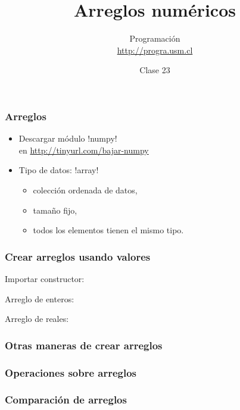 \documentclass[12pt]{beamer}
\title{Arreglos numéricos}
\author{
  Programación \\ \url{http://progra.usm.cl}
}
\date{Clase 23}
\begin{document}
  \begin{frame}
    \maketitle
  \end{frame}

  \begin{frame}
    \label{intro-arreglos}
    \frametitle{Arreglos}
    \begin{itemize}
      \item Descargar módulo \li!numpy! \\
        en \url{http://tinyurl.com/bajar-numpy}
        \vfill
      \item Tipo de datos: \li!array!
        \begin{itemize}
          \item colección ordenada de datos,
          \item tamaño fijo,
          \item todos los elementos
            tienen el mismo tipo.
        \end{itemize}
    \end{itemize}
  \end{frame}

  \begin{frame}
    \label{crear-arreglo-valores}
    \frametitle{Crear arreglos usando valores}
    Importar constructor:
    
    \vfill
    Arreglo de enteros:
    
    \vfill
    Arreglo de reales:
    
  \end{frame}

  \begin{frame}
    \label{crear-arreglo-funciones}
    \frametitle{Otras maneras de crear arreglos}
    
  \end{frame}

  \begin{frame}
    \label{operaciones-arreglos}
    \frametitle{Operaciones sobre arreglos}
    
  \end{frame}

  \begin{frame}
    \label{comparacion-arreglos}
    \frametitle{Comparación de arreglos}
    
  \end{frame}
\end{document}
